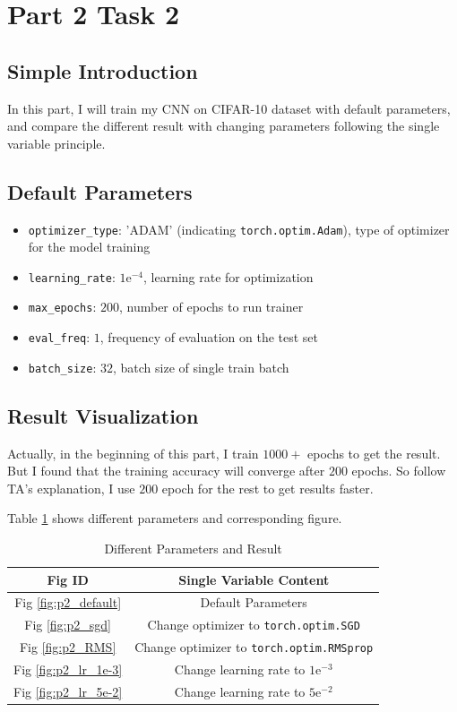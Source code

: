 \documentclass{article}
\begin{document}
\section{Part 2 Task 2}

\subsection{Simple Introduction}

In this part, I will train my CNN on CIFAR-10 dataset with default parameters, and compare the different result with changing parameters following the single variable principle.

\subsection{Default Parameters}

\begin{itemize}
    \item \texttt{optimizer\_type}: 'ADAM' (indicating \texttt{torch.optim.Adam}), type of optimizer for the model training
    \item \texttt{learning\_rate}: $1\mathrm{e}^{-4}$, learning rate for optimization
    \item \texttt{max\_epochs}: $200$, number of epochs to run trainer
    \item \texttt{eval\_freq}: $1$, frequency of evaluation on the test set
    \item \texttt{batch\_size}: $32$, batch size of single train batch
\end{itemize}

\subsection{Result Visualization}

Actually, in the beginning of this part, I train $1000+$ epochs to get the result. But I found that the training accuracy will converge after $200$ epochs. So follow TA’s explanation, I use $200$ epoch for the rest to get results faster.

Table \ref{tab:p2_res_para} shows different parameters and corresponding figure.

\begin{table}[!h]
\centering\caption{Different Parameters and Result}
\label{tab:p2_res_para}
\begin{tabular}{|c|c|}
\hline
\textbf{Fig ID} & \textbf{Single Variable Content} \\
\hline
Fig \ref{fig:p2_default} & Default Parameters \\ \hline
Fig \ref{fig:p2_sgd} & Change optimizer to \texttt{torch.optim.SGD} \\ \hline
Fig \ref{fig:p2_RMS} & Change optimizer to \texttt{torch.optim.RMSprop} \\ \hline
Fig \ref{fig:p2_lr_1e-3} & Change learning rate to $1\mathrm{e}^{-3}$ \\ \hline
Fig \ref{fig:p2_lr_5e-2} & Change learning rate to $5\mathrm{e}^{-2}$ \\ \hline
\end{tabular}
\end{table}
\end{document}
